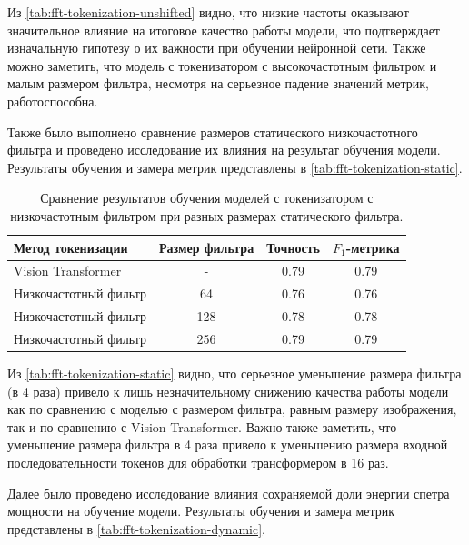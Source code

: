 Из \autoref{tab:fft-tokenization-unshifted} видно, что низкие частоты оказывают значительное влияние на итоговое качество работы модели, что подтверждает изначальную гипотезу о их важности при обучении нейронной сети. Также можно заметить, что модель с токенизатором с высокочастотным фильтром и малым размером фильтра, несмотря на серьезное падение значений метрик, работоспособна.

Также было выполнено сравнение размеров статического низкочастотного фильтра и проведено исследование их влияния на результат обучения модели. Результаты обучения и замера метрик представлены в \autoref{tab:fft-tokenization-static}.

\begin{table}[H]
  \centering
  \begin{tabular}{|l|c|c|c|}
    \hline
    Метод токенизации & Размер фильтра & Точность & $F_1$-метрика \\ \hline
    Vision Transformer & - & 0.79 & 0.79 \\
    Низкочастотный фильтр & 64 & 0.76 & 0.76 \\
    Низкочастотный фильтр & 128 & 0.78 & 0.78 \\
    Низкочастотный фильтр & 256 & 0.79 & 0.79 \\
    \hline
  \end{tabular}

    \caption{Сравнение результатов обучения моделей с токенизатором с низкочастотным фильтром при разных размерах статического фильтра.}
  \label{tab:fft-tokenization-static}
\end{table}

Из \autoref{tab:fft-tokenization-static} видно, что серьезное уменьшение размера фильтра (в 4 раза) привело к лишь незначительному снижению качества работы модели как по сравнению с моделью с размером фильтра, равным размеру изображения, так и по сравнению с Vision Transformer. Важно также заметить, что уменьшение размера фильтра в 4 раза привело к уменьшению размера входной последовательности токенов для обработки трансформером в 16 раз. 

Далее было проведено исследование влияния сохраняемой доли энергии спетра мощности на обучение модели. Результаты обучения и замера метрик представлены в \autoref{tab:fft-tokenization-dynamic}.

